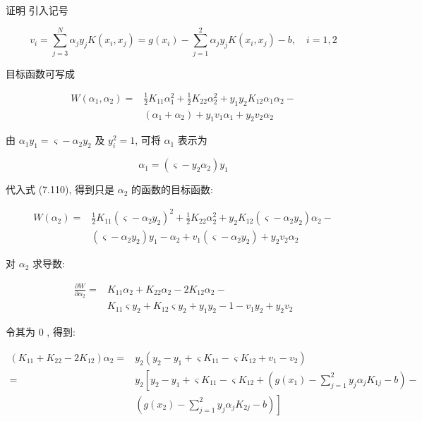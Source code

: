 \documentclass[10pt]{article}
\begin{document}
证明 引入记号

$$
v_{i}=\sum_{j=3}^{N} \alpha_{j} y_{j} K\left(x_{i}, x_{j}\right)=g\left(x_{i}\right)-\sum_{j=1}^{2} \alpha_{j} y_{j} K\left(x_{i}, x_{j}\right)-b, \quad i=1,2
$$

目标函数可写成


\begin{align*}
W\left(\alpha_{1}, \alpha_{2}\right)= & \frac{1}{2} K_{11} \alpha_{1}^{2}+\frac{1}{2} K_{22} \alpha_{2}^{2}+y_{1} y_{2} K_{12} \alpha_{1} \alpha_{2}- \\
& \left(\alpha_{1}+\alpha_{2}\right)+y_{1} v_{1} \alpha_{1}+y_{2} v_{2} \alpha_{2} \tag{7.110}
\end{align*}


由 $\alpha_{1} y_{1}=\varsigma-\alpha_{2} y_{2}$ 及 $y_{i}^{2}=1$, 可将 $\alpha_{1}$ 表示为

$$
\alpha_{1}=\left(\varsigma-y_{2} \alpha_{2}\right) y_{1}
$$

代入式 (7.110), 得到只是 $\alpha_{2}$ 的函数的目标函数:

$$
\begin{aligned}
W\left(\alpha_{2}\right)= & \frac{1}{2} K_{11}\left(\varsigma-\alpha_{2} y_{2}\right)^{2}+\frac{1}{2} K_{22} \alpha_{2}^{2}+y_{2} K_{12}\left(\varsigma-\alpha_{2} y_{2}\right) \alpha_{2}- \\
& \left(\varsigma-\alpha_{2} y_{2}\right) y_{1}-\alpha_{2}+v_{1}\left(\varsigma-\alpha_{2} y_{2}\right)+y_{2} v_{2} \alpha_{2}
\end{aligned}
$$

对 $\alpha_{2}$ 求导数:

$$
\begin{aligned}
\frac{\partial W}{\partial \alpha_{2}}= & K_{11} \alpha_{2}+K_{22} \alpha_{2}-2 K_{12} \alpha_{2}- \\
& K_{11} \varsigma y_{2}+K_{12} \varsigma y_{2}+y_{1} y_{2}-1-v_{1} y_{2}+y_{2} v_{2}
\end{aligned}
$$

令其为 0 , 得到:

$$
\begin{aligned}
\left(K_{11}+K_{22}-2 K_{12}\right) \alpha_{2}= & y_{2}\left(y_{2}-y_{1}+\varsigma K_{11}-\varsigma K_{12}+v_{1}-v_{2}\right) \\
= & y_{2}\left[y_{2}-y_{1}+\varsigma K_{11}-\varsigma K_{12}+\left(g\left(x_{1}\right)-\sum_{j=1}^{2} y_{j} \alpha_{j} K_{1 j}-b\right)-\right. \\
& \left.\left(g\left(x_{2}\right)-\sum_{j=1}^{2} y_{j} \alpha_{j} K_{2 j}-b\right)\right]
\end{aligned}
$$
\end{document}
